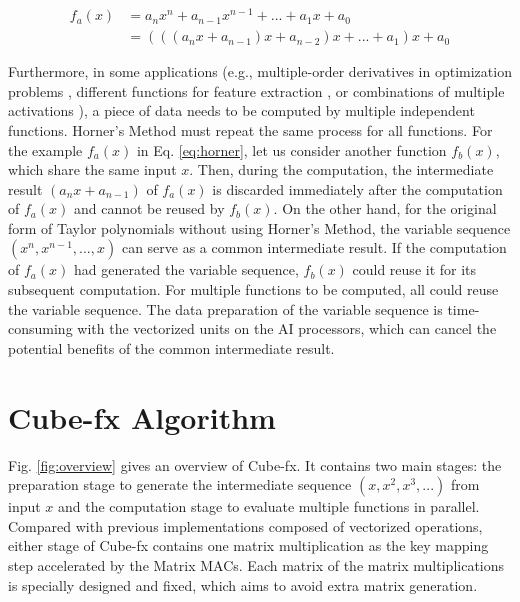 \begin{equation}
    \label{eq:horner}
    \begin{aligned}
    f_a(x) &= a_n x^n + a_{n - 1}x^{n - 1} + ... + a_1 x + a_0 \\
         &= (((a_n x + a_{n - 1}) x + a_{n - 2})x + ... + a_1) x + a_0 
    \end{aligned}
    \end{equation}

Furthermore, in some applications (e.g., multiple-order derivatives in optimization problems \cite{boyd2004convex}, different functions for feature extraction \cite{guyon2006introduction}, or combinations of multiple activations \cite{DBLP:conf/icpr/ManessiR18}), a piece of data needs to be computed by multiple independent functions. Horner's Method must repeat the same process for all functions. For the example $f_a(x)$ in Eq. \ref{eq:horner}, let us consider another function $f_b(x)$, which share the same input $x$.
Then, during the computation, the intermediate result $(a_nx + a_{n-1})$ of $f_a(x)$ is discarded immediately after the computation of $f_a(x)$ and cannot be reused by $f_b(x)$. On the other hand, for the original form of Taylor polynomials without using Horner's Method, the variable sequence $(x^n, x^{n-1}, ..., x)$ can serve as a common intermediate result. If the computation of $f_a(x)$ had generated the variable sequence, $f_b(x)$ could reuse it for its subsequent computation. For multiple functions to be computed, all could reuse the variable sequence. The data preparation of the variable sequence is time-consuming with the vectorized units on the AI processors, which can cancel the potential benefits of the common intermediate result.


\section{Cube-fx Algorithm \label{sec:3}}

Fig. \ref{fig:overview} gives an overview of Cube-fx. It contains two main stages: the preparation stage to generate the intermediate sequence $(x, x^2, x^3, ...)$ from input $x$ and the computation stage to evaluate multiple functions in parallel. Compared with previous implementations composed of vectorized operations, either stage of Cube-fx contains one matrix multiplication as the key mapping step accelerated by the Matrix MACs. Each matrix of the matrix multiplications is specially designed and fixed, which aims to avoid extra matrix generation. 

